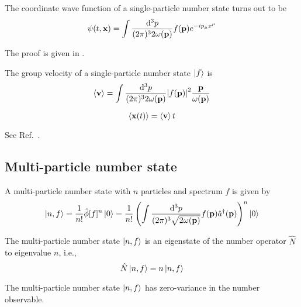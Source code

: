 \begin{lemma}\label{thm:single_particle_number_state_wave_function}
	The coordinate wave function of a single-particle number state turns out to be
	\begin{equation}
		\psi(t,\vb{x})
		=
		\int\frac{\dd[3]{p}}{(2\pi)^32\omega(\vb{p})}
		f(\vb{p})e^{-ip_\mu x^\mu}
	\end{equation}
\end{lemma}
The proof is given in .
\begin{lemma}\label{thm:single_particle_number_state_group_velocity}
	The group velocity of a single-particle number state $\ket{f}$ is
	\begin{equation}
		\expval{\vb{v}}
		=
		\int\frac{\dd[3]{p}}{(2\pi)^32\omega(\vb{p})}
		\abs{f(\vb{p})}^2
		\frac{\vb{p}}{\omega(\vb{p})}
		\label{eq:single_particle_number_state_group_velocity}
	\end{equation}
\end{lemma}
\begin{example}
	\begin{equation}
		\expval{\vb{x}(t)}
		=
		\expval{\vb{v}}t
	\end{equation}	
\end{example}
\begin{example}
	See Ref.~\cite{Naumov2013}.
\end{example}

\subsection{Multi-particle number state}

\begin{definition}
	A multi-particle number state with $n$ particles and spectrum $f$ is given by
	\begin{equation}
		\ket{n,f}
		=
		\frac{1}{n!}
		\hat\phi[f]^n
		\ket{0}
		=
		\frac{1}{n!}
		\left(
			\int\frac{\dd[3]{p}}{(2\pi)^3\sqrt{2\omega(\vb{p})}}
			f(\vb{p})
			\hat{a}^\dagger(\vb{p})
		\right)^n
		\ket{0}
	\end{equation}
\end{definition}
\begin{theorem}
	The multi-particle number state $\ket{n,f}$ is an eigenstate of the number operator $\hat{N}$ to eigenvalue $n$, i.e.,
	\begin{equation}
		\hat{N}
		\ket{n,f}
		=
		n
		\ket{n,f}
	\end{equation}
\end{theorem}
\begin{corollary}
	The multi-particle number state $\ket{n,f}$ has zero-variance in the number observable.
\end{corollary}

